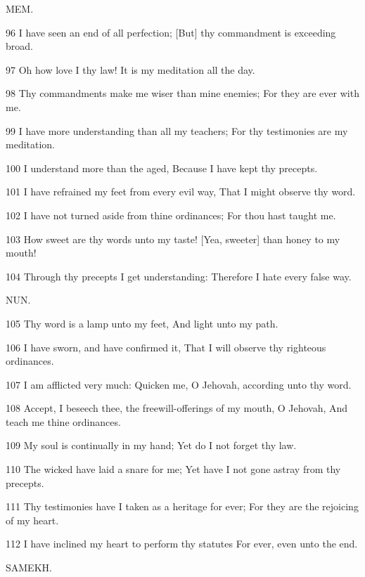\par MEM.

\par 96 I have seen an end of all perfection; [But] thy commandment is exceeding broad.
\par 97 Oh how love I thy law! It is my meditation all the day.
\par 98 Thy commandments make me wiser than mine enemies; For they are ever with me.
\par 99 I have more understanding than all my teachers; For thy testimonies are my meditation.
\par 100 I understand more than the aged, Because I have kept thy precepts.
\par 101 I have refrained my feet from every evil way, That I might observe thy word.
\par 102 I have not turned aside from thine ordinances; For thou hast taught me.
\par 103 How sweet are thy words unto my taste! [Yea, sweeter] than honey to my mouth!
\par 104 Through thy precepts I get understanding: Therefore I hate every false way.

\par NUN.

\par 105 Thy word is a lamp unto my feet, And light unto my path.
\par 106 I have sworn, and have confirmed it, That I will observe thy righteous ordinances.
\par 107 I am afflicted very much: Quicken me, O Jehovah, according unto thy word.
\par 108 Accept, I beseech thee, the freewill-offerings of my mouth, O Jehovah, And teach me thine ordinances.
\par 109 My soul is continually in my hand; Yet do I not forget thy law.
\par 110 The wicked have laid a snare for me; Yet have I not gone astray from thy precepts.
\par 111 Thy testimonies have I taken as a heritage for ever; For they are the rejoicing of my heart.
\par 112 I have inclined my heart to perform thy statutes For ever, even unto the end.

\par SAMEKH.

